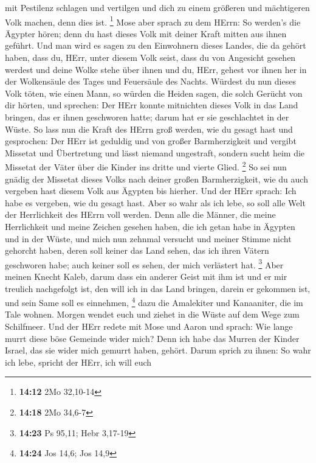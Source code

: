 mit Pestilenz schlagen und vertilgen und dich zu einem größeren und
mächtigeren Volk machen, denn dies ist. \footnote{\textbf{14:12} 2Mo
  32,10-14}  Mose aber sprach zu dem HErrn: So werden's die
Ägypter hören; denn du hast dieses Volk mit deiner Kraft mitten aus
ihnen geführt.  Und man wird es sagen zu den Einwohnern
dieses Landes, die da gehört haben, dass du, HErr, unter diesem Volk
seist, dass du von Angesicht gesehen werdest und deine Wolke stehe über
ihnen und du, HErr, gehest vor ihnen her in der Wolkensäule des Tages
und Feuersäule des Nachts.  Würdest du nun dieses Volk
töten, wie einen Mann, so würden die Heiden sagen, die solch Gerücht von
dir hörten, und sprechen:  Der HErr konnte mitnichten
dieses Volk in das Land bringen, das er ihnen geschworen hatte; darum
hat er sie geschlachtet in der Wüste.  So lass nun die
Kraft des HErrn groß werden, wie du gesagt hast und gesprochen:
 Der HErr ist geduldig und von großer Barmherzigkeit und
vergibt Missetat und Übertretung und lässt niemand ungestraft, sondern
sucht heim die Missetat der Väter über die Kinder ins dritte und vierte
Glied. \footnote{\textbf{14:18} 2Mo 34,6-7}  So sei nun
gnädig der Missetat dieses Volks nach deiner großen Barmherzigkeit, wie
du auch vergeben hast diesem Volk aus Ägypten bis hierher. 
Und der HErr sprach: Ich habe es vergeben, wie du gesagt hast.
 Aber so wahr als ich lebe, so soll alle Welt der
Herrlichkeit des HErrn voll werden.  Denn alle die Männer,
die meine Herrlichkeit und meine Zeichen gesehen haben, die ich getan
habe in Ägypten und in der Wüste, und mich nun zehnmal versucht und
meiner Stimme nicht gehorcht haben,  deren soll keiner das
Land sehen, das ich ihren Vätern geschworen habe; auch keiner soll es
sehen, der mich verlästert hat. \footnote{\textbf{14:23} Ps 95,11; Hebr
  3,17-19}  Aber meinen Knecht Kaleb, darum dass ein
anderer Geist mit ihm ist und er mir treulich nachgefolgt ist, den will
ich in das Land bringen, darein er gekommen ist, und sein Same soll es
einnehmen, \footnote{\textbf{14:24} Jos 14,6; Jos 14,9} 
dazu die Amalekiter und Kanaaniter, die im Tale wohnen. Morgen wendet
euch und ziehet in die Wüste auf dem Wege zum Schilfmeer. 
Und der HErr redete mit Mose und Aaron und sprach:  Wie
lange murrt diese böse Gemeinde wider mich? Denn ich habe das Murren der
Kinder Israel, das sie wider mich gemurrt haben, gehört. 
Darum sprich zu ihnen: So wahr ich lebe, spricht der HErr, ich will euch

